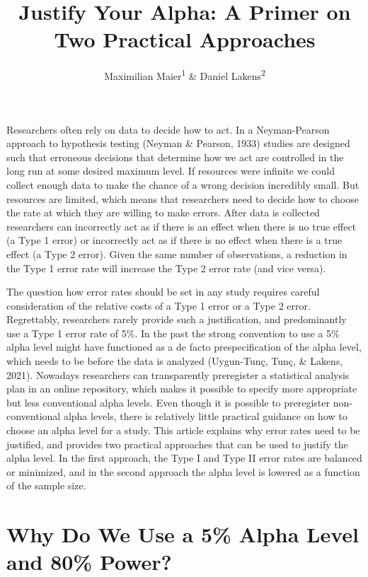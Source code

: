 \documentclass[
  english,
  ,man, a4paper,floatsintext]{apa6}
\title{Justify Your Alpha: A Primer on Two Practical Approaches}
\author{Maximilian Maier\textsuperscript{1} \& Daniel Lakens\textsuperscript{2}}
\date{}
\affiliation{\vspace{0.5cm}\textsuperscript{1} University of Amsterdam, The Netherlands\\\textsuperscript{2} Eindhoven University of Technology, The Netherlands}
\begin{document}
\maketitle

Researchers often rely on data to decide how to act. In a Neyman-Pearson approach to hypothesis testing (Neyman \& Pearson, 1933) studies are designed such that erroneous decisions that determine how we act are controlled in the long run at some desired maximum level. If resources were infinite we could collect enough data to make the chance of a wrong decision incredibly small. But resources are limited, which means that researchers need to decide how to choose the rate at which they are willing to make errors. After data is collected researchers can incorrectly act as if there is an effect when there is no true effect (a Type 1 error) or incorrectly act as if there is no effect when there is a true effect (a Type 2 error). Given the same number of observations, a reduction in the Type 1 error rate will increase the Type 2 error rate (and vice versa).

The question how error rates should be set in any study requires careful consideration of the relative costs of a Type 1 error or a Type 2 error. Regrettably, researchers rarely provide such a justification, and predominantly use a Type 1 error rate of 5\%. In the past the strong convention to use a 5\% alpha level might have functioned as a de facto prespecification of the alpha level, which needs to be before the data is analyzed (Uygun-Tunç, Tunç, \& Lakens, 2021). Nowadays researchers can transparently preregister a statistical analysis plan in an online repository, which makes it possible to specify more appropriate but less conventional alpha levels. Even though it is possible to preregister non-conventional alpha levels, there is relatively little practical guidance on how to choose an alpha level for a study. This article explains why error rates need to be justified, and provides two practical approaches that can be used to justify the alpha level. In the first approach, the Type I and Type II error rates are balanced or minimized, and in the second approach the alpha level is lowered as a function of the sample size.

\hypertarget{why-do-we-use-a-5-alpha-level-and-80-power}{%
\section{Why Do We Use a 5\% Alpha Level and 80\% Power?}\label{why-do-we-use-a-5-alpha-level-and-80-power}}
\end{document}

